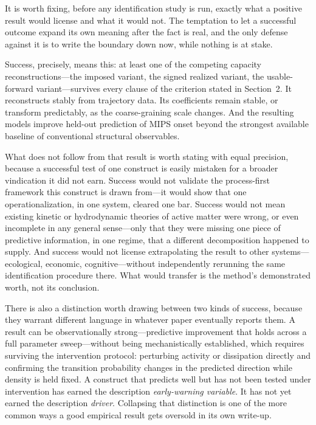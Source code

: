 \documentclass[11pt]{article}
\begin{document}
It is worth fixing, before any identification study is run, exactly what a positive result would license and what it would not. The temptation to let a successful outcome expand its own meaning after the fact is real, and the only defense against it is to write the boundary down now, while nothing is at stake.

Success, precisely, means this: at least one of the competing capacity reconstructions---the imposed variant, the signed realized variant, the usable-forward variant---survives every clause of the criterion stated in Section~2. It reconstructs stably from trajectory data. Its coefficients remain stable, or transform predictably, as the coarse-graining scale changes. And the resulting models improve held-out prediction of MIPS onset beyond the strongest available baseline of conventional structural observables.

What does not follow from that result is worth stating with equal precision, because a successful test of one construct is easily mistaken for a broader vindication it did not earn. Success would not validate the process-first framework this construct is drawn from---it would show that one operationalization, in one system, cleared one bar. Success would not mean existing kinetic or hydrodynamic theories of active matter were wrong, or even incomplete in any general sense---only that they were missing one piece of predictive information, in one regime, that a different decomposition happened to supply. And success would not license extrapolating the result to other systems---ecological, economic, cognitive---without independently rerunning the same identification procedure there. What would transfer is the method's demonstrated worth, not its conclusion.

There is also a distinction worth drawing between two kinds of success, because they warrant different language in whatever paper eventually reports them. A result can be observationally strong---predictive improvement that holds across a full parameter sweep---without being mechanistically established, which requires surviving the intervention protocol: perturbing activity or dissipation directly and confirming the transition probability changes in the predicted direction while density is held fixed. A construct that predicts well but has not been tested under intervention has earned the description \emph{early-warning variable}. It has not yet earned the description \emph{driver}. Collapsing that distinction is one of the more common ways a good empirical result gets oversold in its own write-up.
\end{document}
